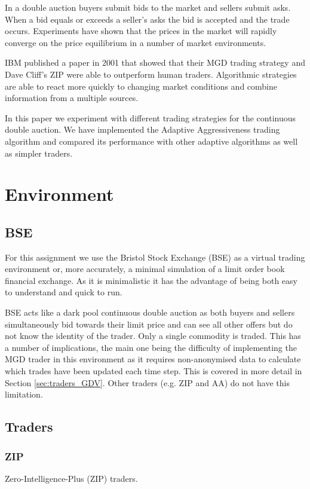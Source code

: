 \documentclass{acm_proc_article-sp}
\begin{document}
In a double auction buyers submit bids to the market and sellers submit asks.
When a bid equals or exceeds a seller's asks the bid is accepted and the trade
occurs. Experiments have shown  that the prices in the market will
rapidly converge on the price equilibrium in a number of market
environments\cite{smith_1962}.

IBM published a paper in 2001 that showed that their MGD trading strategy and
Dave Cliff's ZIP were able to outperform human traders\cite{ibm_human}.
Algorithmic strategies are able to react more quickly to changing market
conditions and combine information from a multiple sources.

In this paper we experiment with different trading strategies for the
continuous double auction.
We have implemented the Adaptive Aggressiveness trading algorithm and compared
its performance with other adaptive algorithms as well as simpler traders.\\


\section{Environment} \label{sec:environment}
\subsection{BSE} \label{sec:BSE}
For this assignment we use the Bristol Stock Exchange (BSE) as a virtual trading environment or, 
more accurately, a minimal simulation of a limit order book financial exchange. As it is 
minimalistic it has the advantage of being both easy to understand and quick to run.

BSE acts like a dark pool continuous double auction as both buyers and sellers simultaneously bid 
towards their limit price and can see all other offers but do not know the identity of the trader.
Only a single commodity is traded. 
This has a number of implications, the main one being the difficulty of implementing the MGD trader 
in this environment as it requires non-anonymised data to calculate which trades have been updated 
each time step. This is covered in more detail in Section \ref{sec:traders_GDV}. Other traders (e.g. 
ZIP and AA) do not have this limitation.\\


\subsection{Traders} \label{sec:traders}
\subsubsection{ZIP} \label{sec:traders_ZIP}
Zero-Intelligence-Plus (ZIP) traders.\\
\end{document}

